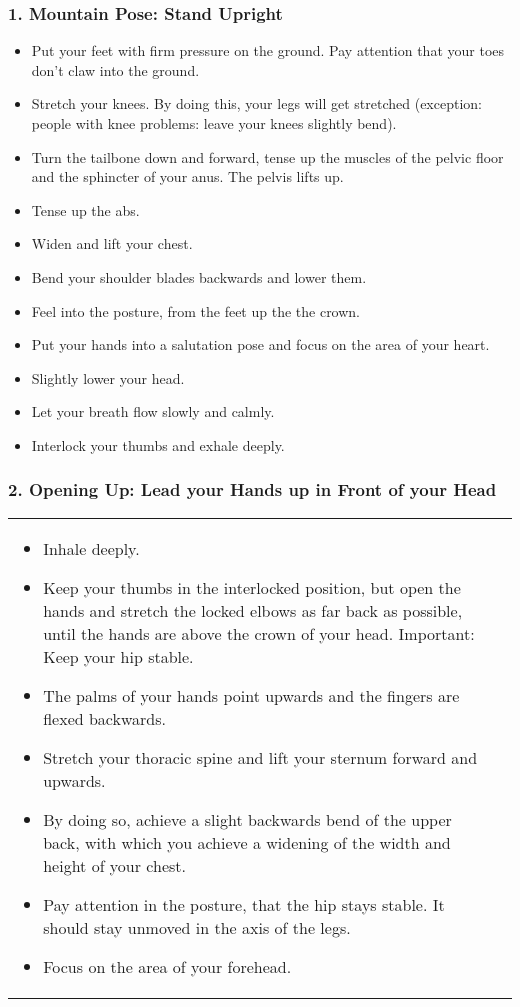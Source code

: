 \documentclass[../Book.Stress_regulation.tex]{subfiles}
\begin{document}
\subsubsection{1. Mountain Pose: Stand Upright}
\begin{itemize}
\item Put your feet with firm pressure on the ground. Pay attention that your toes don't claw into the ground.
\item Stretch your knees. By doing this, your legs will get stretched (exception: people with knee problems: leave your knees slightly bend).
\item Turn the tailbone down and forward, tense up the muscles of the pelvic floor and the sphincter of your anus. The pelvis lifts up.
\item Tense up the abs.
\item Widen and lift your chest.
\item Bend your shoulder blades backwards and lower them.
\item Feel into the posture, from the feet up the the crown.
\item Put your hands into a salutation pose and focus on the area of your heart.
\item Slightly lower your head.
\item Let your breath flow slowly and calmly.
\item Interlock your thumbs and exhale deeply.
\end{itemize}

\subsubsection{2. Opening Up: Lead your Hands up in Front of your Head}

\begin{tabular}{p{9.7cm} p{1.8cm}}
  
\begin{itemize}
\item Inhale deeply.
\item Keep your thumbs in the interlocked position, but open the hands and stretch the locked elbows as far back as possible, until the hands are above the crown of your head. Important: Keep your hip stable.
\item The palms of your hands point upwards and the fingers are flexed backwards.
\item Stretch your thoracic spine and lift your sternum forward and upwards.
\item By doing so, achieve a slight backwards bend of the upper back, with which you achieve a widening of the width and height of your chest.
\item Pay attention in the posture, that the hip stays stable. It should stay unmoved in the axis of the legs.
\item Focus on the area of your forehead.
\end{itemize}
  &
    \raisebox{-1.2\totalheight}{\texttt{[image: SS\_Opening]}}
  
\end{tabular}
\newpage
\end{document}
